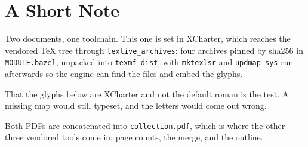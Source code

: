 \documentclass{article}
\begin{document}
\section*{A Short Note}

Two documents, one toolchain. This one is set in XCharter, which reaches the
vendored TeX tree through \texttt{texlive\_archives}: four archives pinned by
sha256 in \texttt{MODULE.bazel}, unpacked into \texttt{texmf-dist}, with
\texttt{mktexlsr} and \texttt{updmap-sys} run afterwards so the engine can find
the files and embed the glyphs.

That the glyphs below are XCharter and not the default roman is the test. A
missing map would still typeset, and the letters would come out wrong.

Both PDFs are concatenated into \texttt{collection.pdf}, which is where the
other three vendored tools come in: page counts, the merge, and the outline.
\end{document}

